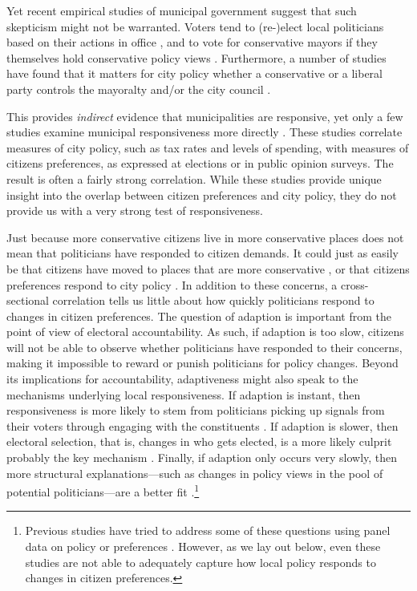 \documentclass[a4paper,12pt]{article}
\begin{document}
Yet recent empirical studies of municipal government suggest that such skepticism might not be warranted. Voters tend to (re-)elect local politicians based on their actions in office \citep[e.g.,][]{boyne2009democracy,larsen2018relationship}, and to vote for conservative  mayors if they themselves hold conservative policy views  \citep{sances2017ideology,boudreau2015lost,hopkins2017retrospective}. Furthermore, a number of studies have found that it matters for city policy whether a conservative or a liberal party controls the mayoralty and/or the city council \citep[e.g.,][]{fiva2016power,blom2006parties,de2016mayoral}.  

This provides \textit{indirect} evidence that municipalities are responsive, yet only a few studies examine municipal responsiveness more directly \citep{tausanovitch2014representation,hajnal2010or,palus2010responsiveness,einstein2016pushing}. These studies correlate measures of city policy, such as tax rates and levels of spending, with measures of citizens preferences, as expressed at elections or in public opinion surveys. The result is often a fairly strong correlation. While these studies provide unique insight into the overlap between citizen preferences and city policy, they do not provide us with a very strong test of responsiveness. 

Just because more conservative citizens live in more conservative places does not mean that politicians have responded to citizen demands. It could just as easily be that citizens have moved to places that are more conservative \citep{tiebout1956pure}, or that citizens preferences respond to city policy \citep{slothuus2010can,broockman2017causal}. In addition to these concerns, a cross-sectional correlation tells us little about how quickly politicians respond to changes in citizen preferences. The question of adaption is important from the point of view of electoral accountability. As such, if adaption is too slow, citizens will not be able to observe whether politicians have responded to their concerns, making it impossible to reward or punish politicians for policy changes. Beyond its implications for accountability, adaptiveness might also speak to the mechanisms underlying local responsiveness. If adaption is instant, then responsiveness is more likely to stem from politicians picking up signals from their voters through engaging with the constituents \citep{butler2011can}. If adaption is slower, then electoral selection, that is, changes in who gets elected, is a more likely culprit probably the key mechanism \citep{mansbridge2009selection}. Finally, if adaption only occurs very slowly, then more structural explanations---such as changes in policy views in the pool of potential politicians---are a better fit \citep[][90]{erikson1993statehouse}.\footnote{Previous studies have tried to address some of these questions using panel data on policy or preferences \citep[see][]{einstein2016pushing,sances2017voters}. However, as we lay out below, even these studies are not able to adequately capture how local policy responds to changes in citizen preferences.}
\end{document}
